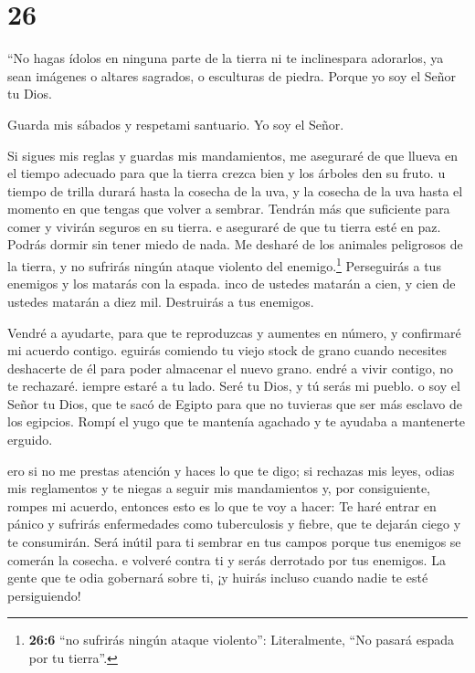 \hypertarget{section-25}{%
\section{26}\label{section-25}}

 ``No hagas ídolos en ninguna parte de la tierra ni te
inclinespara adorarlos, ya sean imágenes o altares sagrados, o
esculturas de piedra. Porque yo soy el Señor tu Dios.

 Guarda mis sábados y respetami santuario. Yo soy el Señor.

 Si sigues mis reglas y guardas mis mandamientos,
 me aseguraré de que llueva en el tiempo adecuado para que
la tierra crezca bien y los árboles den su fruto.  u tiempo
de trilla durará hasta la cosecha de la uva, y la cosecha de la uva
hasta el momento en que tengas que volver a sembrar. Tendrán más que
suficiente para comer y vivirán seguros en su tierra.  e
aseguraré de que tu tierra esté en paz. Podrás dormir sin tener miedo de
nada. Me desharé de los animales peligrosos de la tierra, y no sufrirás
ningún ataque violento del enemigo.\footnote{\textbf{26:6} ``no sufrirás
  ningún ataque violento'': Literalmente, ``No pasará espada por tu
  tierra''.}  Perseguirás a tus enemigos y los matarás con
la espada.  inco de ustedes matarán a cien, y cien de
ustedes matarán a diez mil. Destruirás a tus enemigos.

 Vendré a ayudarte, para que te reproduzcas y aumentes en
número, y confirmaré mi acuerdo contigo.  eguirás comiendo
tu viejo stock de grano cuando necesites deshacerte de él para poder
almacenar el nuevo grano.  endré a vivir contigo, no te
rechazaré.  iempre estaré a tu lado. Seré tu Dios, y tú
serás mi pueblo.  o soy el Señor tu Dios, que te sacó de
Egipto para que no tuvieras que ser más esclavo de los egipcios. Rompí
el yugo que te mantenía agachado y te ayudaba a mantenerte erguido.

 ero si no me prestas atención y haces lo que te digo;
 si rechazas mis leyes, odias mis reglamentos y te niegas a
seguir mis mandamientos y, por consiguiente, rompes mi acuerdo,
 entonces esto es lo que te voy a hacer: Te haré entrar en
pánico y sufrirás enfermedades como tuberculosis y fiebre, que te
dejarán ciego y te consumirán. Será inútil para ti sembrar en tus campos
porque tus enemigos se comerán la cosecha.  e volveré
contra ti y serás derrotado por tus enemigos. La gente que te odia
gobernará sobre ti, ¡y huirás incluso cuando nadie te esté persiguiendo!

